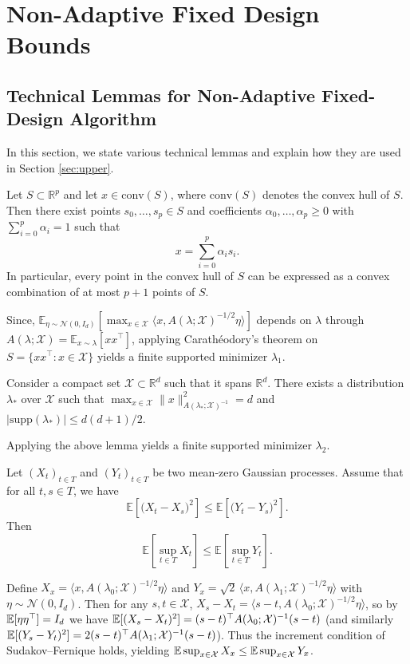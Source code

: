 \section{Non-Adaptive Fixed Design Bounds}
\subsection{Technical Lemmas for Non-Adaptive Fixed-Design Algorithm}\label{appendix:technical-lemmas}
In this section, we state various technical lemmas and explain how they are used in Section \ref{sec:upper}.
\begin{lemma}\label{thm:caratheodory}
Let $S \subset \mathbb{R}^p$ and let $x \in \mathrm{conv}(S)$, where $\mathrm{conv}(S)$ denotes the convex hull of $S$.
Then there exist points $s_0,\dots,s_p \in S$ and coefficients $\alpha_0,\dots,\alpha_p \ge 0$ with
$\sum_{i=0}^p \alpha_i = 1$ such that
\[
x = \sum_{i=0}^p \alpha_i s_i.
\]
In particular, every point in the convex hull of $S$ can be expressed as a convex combination of at most $p+1$ points of $S$.
\end{lemma}
Since, $\mathbb{E}_{\eta\sim\mathcal{N}(0,I_d)}[\max_{x\in\mathcal{X}}\langle x, A(\lambda ;\mathcal{X})^{-1/2}\eta\rangle]$ depends on $\lambda$ through $A(\lambda ;\mathcal{X})=\mathbb{E}_{x\sim\lambda}[xx^\top]$, applying Carath\'eodory's theorem on $S=\{xx^\top:x\in\mathcal{X}\}$ yields a finite supported minimizer $\lambda_1$.

\begin{lemma}
    Consider a compact set $\mathcal{X}\subset \mathbb{R}^d$ such that it spans $\mathbb{R}^d$. There exists a distribution $\lambda_*$ over $\mathcal{X}$ such that $\max_{x\in\mathcal{X}}\|x\|^2_{A(\lambda_*;\mathcal{X})^{-1}}=d$ and $|\mathrm{supp}(\lambda_*)|\leq d(d+1)/2$.
\end{lemma}
Applying the above lemma yields a finite supported minimizer $\lambda_2$.


\begin{lemma}\label{thm:sudakov-fernique}
Let $(X_t)_{t\in T}$ and $(Y_t)_{t\in T}$ be two mean-zero Gaussian processes. Assume that for all $t,s\in T$, we have
\[
\mathbb{E}\left[\bigl( X_t - X_s \bigr)^2\right] \le \mathbb{E}\left[\bigl( Y_t - Y_s \bigr)^2\right].
\]
Then
\[
\mathbb{E}\left[\sup_{t\in T} X_t \right]\le \mathbb{E}\left[\sup_{t\in T} Y_t\right].
\]
\end{lemma}

Define $X_x=\langle x, A(\lambda_0;\mathcal X)^{-1/2}\eta\rangle$ and $Y_x=\sqrt2\,\langle x, A(\lambda_1;\mathcal X)^{-1/2}\eta\rangle$ with $\eta\sim\mathcal N(0,I_d)$.  
Then for any $s,t\in\mathcal X$, $X_s-X_t=\langle s-t, A(\lambda_0;\mathcal X)^{-1/2}\eta\rangle$, so by $\mathbb{E}[\eta\eta^\top]=I_d$ we have $\mathbb{E}[(X_s-X_t)^2]=(s-t)^\top A(\lambda_0;\mathcal X)^{-1}(s-t)$ (and similarly $\mathbb{E}[(Y_s-Y_t)^2]=2(s-t)^\top A(\lambda_1;\mathcal X)^{-1}(s-t)$).  
Thus the increment condition of Sudakov--Fernique holds, yielding $\mathbb{E}\sup_{x\in\mathcal X}X_x\le \mathbb{E}\sup_{x\in\mathcal X}Y_x$.



